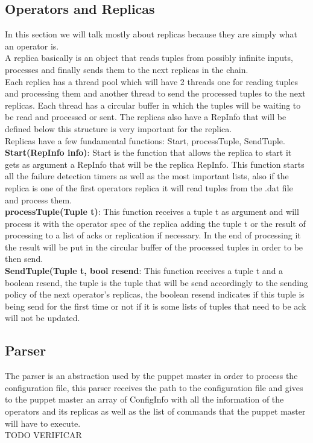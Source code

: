 \documentclass[times, 10pt, twocolumn]{article}
\begin{document}
\subsection{Operators and Replicas}
In this section we will talk mostly about replicas because they are simply what an operator is.
\\A replica basically is an object that reads tuples from possibly infinite inputs, processes and finally sends them to the next replicas in the chain.
\\Each replica has a thread pool which will have 2 threads one for reading tuples and processing them and another thread to send the processed tuples to the next replicas. Each thread has a circular buffer in which the tuples will be waiting to be read and processed or sent. The replicas also have a RepInfo that will be defined below this structure is very important for the replica.
\\Replicas have a few fundamental functions: Start, processTuple, SendTuple.
\\\textbf{Start(RepInfo info)}: Start is the function that allows the replica to start it gets as argument a RepInfo that will be the replica RepInfo. This function starts all the failure detection timers as well as the most important lists, also if the replica is one of the first operators replica it will read tuples from the .dat file and process them.
\\\textbf{processTuple(Tuple t)}: This function receives a tuple t as argument and will process it with the operator spec of the replica adding the tuple t or the result of processing to a list of acks or replication if necessary. In the end of processing it the result will be put in the circular buffer of the processed tuples in order to be then send.
\\\textbf{SendTuple(Tuple t, bool resend}: This function receives a tuple t and a boolean resend, the tuple is the tuple that will be send accordingly to the sending policy of the next operator's replicas, the boolean resend indicates if this tuple is being send for the first time or not if it is some lists of tuples that need to be ack will not be updated.



\subsection{Parser}
The parser is an abstraction used by the puppet master in order to process the configuration file, this parser receives the path to the configuration file and gives to the puppet master an array of ConfigInfo with all the information of the operators and its replicas as well as the list of commands that the puppet master will have to execute.
\\TODO VERIFICAR
\end{document}
